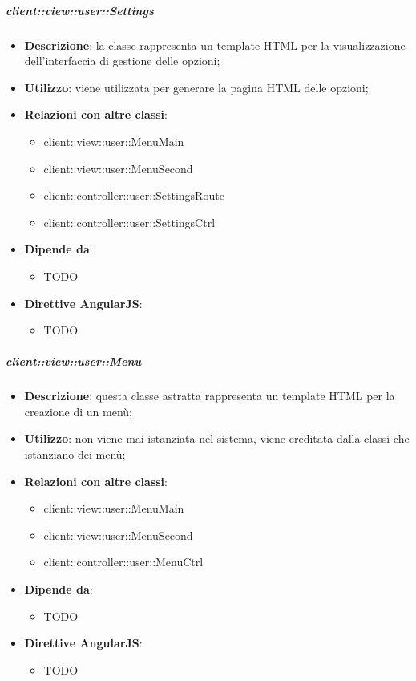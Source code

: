 		\subparagraph{client::view::user::Settings} %
		\label{subp:bdsm_app_client_view_user_settings}

			\begin{itemize}
				\item \textbf{Descrizione}: la classe rappresenta un template HTML per la visualizzazione dell'interfaccia di gestione delle opzioni;
				\item \textbf{Utilizzo}: viene utilizzata per generare la pagina HTML delle opzioni;
				\item \textbf{Relazioni con altre classi}:
					\begin{itemize}
						\item client::view::user::MenuMain
						\item client::view::user::MenuSecond
						\item client::controller::user::SettingsRoute
						\item client::controller::user::SettingsCtrl
					\end{itemize}
				\item \textbf{Dipende da}:
					\begin{itemize}
						\item TODO
					\end{itemize}
				\item \textbf{Direttive AngularJS}:
					\begin{itemize}
						\item TODO
					\end{itemize}
			\end{itemize}

		\subparagraph{client::view::user::Menu} %
		\label{subp:bdsm_app_client_view_user_menu}
			\begin{itemize}
				\item \textbf{Descrizione}: questa classe astratta rappresenta un template HTML per la creazione di un menù;
				\item \textbf{Utilizzo}: non viene mai istanziata nel sistema, viene ereditata dalla classi che istanziano dei menù;
				\item \textbf{Relazioni con altre classi}:
					\begin{itemize}
						\item client::view::user::MenuMain
						\item client::view::user::MenuSecond
						\item client::controller::user::MenuCtrl
					\end{itemize}
				\item \textbf{Dipende da}:
					\begin{itemize}
						\item TODO
					\end{itemize}
				\item \textbf{Direttive AngularJS}:
					\begin{itemize}
						\item TODO
					\end{itemize}
			\end{itemize}

